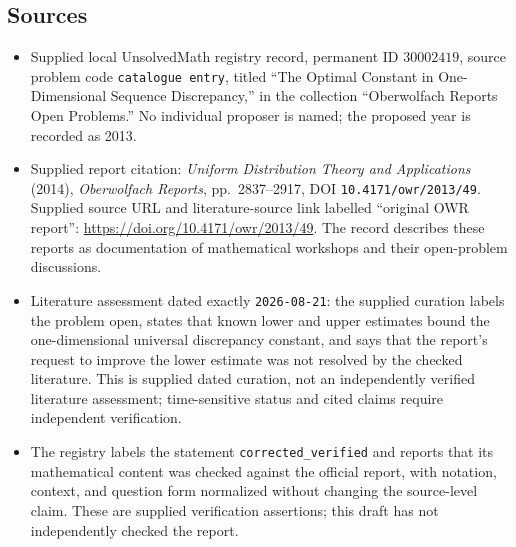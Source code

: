 \documentclass[11pt]{article}
\begin{document}
\subsection{Sources}
\begin{itemize}
\item Supplied local UnsolvedMath registry record, permanent ID \(30002419\), source problem code \texttt{catalogue entry}, titled ``The Optimal Constant in One-Dimensional Sequence Discrepancy,'' in the collection ``Oberwolfach Reports Open Problems.'' No individual proposer is named; the proposed year is recorded as 2013.
\item Supplied report citation: \emph{Uniform Distribution Theory and Applications} (2014), \emph{Oberwolfach Reports}, pp.\ 2837--2917, DOI \texttt{10.4171/owr/2013/49}. Supplied source URL and literature-source link labelled ``original OWR report'': \url{https://doi.org/10.4171/owr/2013/49}. The record describes these reports as documentation of mathematical workshops and their open-problem discussions.
\item Literature assessment dated exactly \texttt{2026-08-21}: the supplied curation labels the problem open, states that known lower and upper estimates bound the one-dimensional universal discrepancy constant, and says that the report's request to improve the lower estimate was not resolved by the checked literature. This is supplied dated curation, not an independently verified literature assessment; time-sensitive status and cited claims require independent verification.
\item The registry labels the statement \texttt{corrected\_verified} and reports that its mathematical content was checked against the official report, with notation, context, and question form normalized without changing the source-level claim. These are supplied verification assertions; this draft has not independently checked the report.
\end{itemize}
\end{document}
